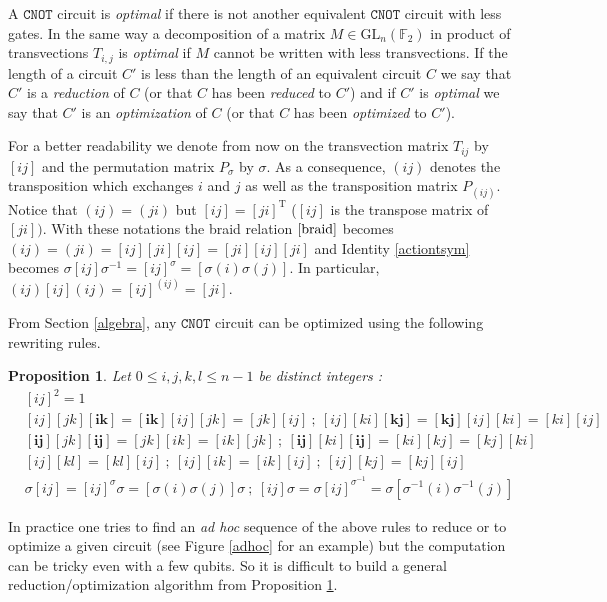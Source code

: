 \documentclass[a4paper,12pt,fleqn]{article}
\newcommand\cnot{\mathtt{CNOT}}
\newcommand\GL[1][n]{\mathrm{GL}_{#1}(\mathbb{F}_2)}
\renewcommand\leq{\leqslant}
\newtheorem{prop}[theo]{Proposition}
\begin{document}
A $\cnot$  circuit is \emph{optimal} if there is not another equivalent $\cnot$ circuit with less gates. In the same way a decomposition of a matrix $M \in \GL$ in product of transvections $T_{i,j}$ is \emph{optimal} if $M$ cannot be written with less transvections.
If the length of a  circuit $C'$ is less than the length of an equivalent circuit $C$  we say that $C'$ is a \emph{reduction} of $C$ (or that $C$ has been \emph{reduced} to $C'$) and if $C'$ is \emph{optimal} we say that $C'$ is an \emph{optimization} of $C$ (or that $C$ has been \emph{optimized} to $C'$).

For a better readability we denote from now on the transvection matrix $T_{ij}$ by $[ij]$ and the permutation matrix $P_{\sigma}$
by $\sigma$. As a consequence,  $(ij)$ denotes the transposition which exchanges $i$ and $j$ as well as the transposition matrix $P_{(ij)}$.
Notice that $(ij)=(ji)$ but $[ij]=[ji]^{\mathrm{T}}$ ($[ij]$ is the transpose matrix of $[ji])$. With these notations the braid relation $\eqref{braid}$ becomes
$(ij)=(ji)=[ij][ji][ij]=[ji][ij][ji]$ and Identity \eqref{actiontsym} becomes $\sigma [ij]\sigma^{-1}=[ij]^{\sigma}=[\sigma(i)\sigma(j)]$. In particular, $(ij)[ij](ij)=[ij]^{(ij)}=[ji]$.
\medskip

From Section \ref{algebra}, any $\cnot$ circuit can be optimized using the following rewriting rules.
\begin{prop} \label{reduction}Let $0\leq i,j,k,l\leq n-1$ be distinct integers : 
  \begin{align}    
    &[ij]^2=1\label{invT}\\
    &[ij][jk]\mathbf{[ik]}=\mathbf{[ik]}[ij][jk]=[jk][ij] \ ;\  [ij][ki]\mathbf{[kj]}=\mathbf{[kj]}[ij][ki]=[ki][ij] \label{redcom}\\
    &\mathbf{[ij]}[jk]\mathbf{[ij]}=[jk][ik]=[ik][jk] \ ;\ \mathbf{[ij]}[ki]\mathbf{[ij]}=[ki][kj]=[kj][ki]\label{conjT}\\
    &[ij][kl]=[kl][ij]\ ;\ [ij][ik]=[ik][ij] \ ;\  [ij][kj]=[kj][ij] \label{comT}\\
    &\sigma[ij]=[ij]^{\sigma}\sigma=[\sigma(i)\sigma(j)]\sigma \ ;\ [ij]\sigma=\sigma[ij]^{\sigma^{-1}}=\sigma[\sigma^{-1}(i)\sigma^{-1}(j)]\label{permcom}
  \end{align}
\end{prop}

In practice one tries to find an \emph{ad hoc} sequence of the above rules to reduce or to optimize  a given circuit (see Figure \ref{adhoc} for an example) but the computation can be tricky even with a few qubits. So it is difficult to build a general reduction/optimization algorithm from Proposition \ref{reduction}.
\end{document}
